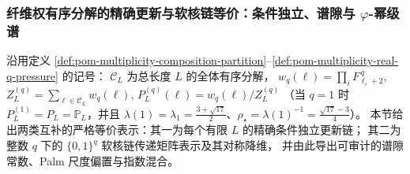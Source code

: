 %
%

\subsubsection{纤维权有序分解的精确更新与软核链等价：条件独立、谱隙与 \texorpdfstring{$\varphi$}{phi}-幂级谱}\label{subsec:pom-multiplicity-composition-exact-update-softcore}
沿用定义 \ref{def:pom-multiplicity-composition-partition}--\ref{def:pom-multiplicity-real-q-pressure} 的记号：
\(\mathcal{C}_L\) 为总长度 \(L\) 的全体有序分解，
\(
w_q(\boldsymbol{\ell})=\prod_i F_{\ell_i+2}^{\,q}
\),
\(
Z_L^{(q)}=\sum_{\boldsymbol{\ell}\in\mathcal{C}_L}w_q(\boldsymbol{\ell})
\),
\(
P_L^{(q)}(\boldsymbol{\ell})=w_q(\boldsymbol{\ell})/Z_L^{(q)}
\)
（当 \(q=1\) 时 \(P_L^{(1)}=P_L=\mathbb{P}_L\)，并且 \(\lambda(1)=\lambda_1=\frac{3+\sqrt{17}}{2}\)、\(\rho_\star=\lambda(1)^{-1}=\frac{\sqrt{17}-3}{4}\)）。
本节给出两类互补的严格等价表示：其一为每个有限 \(L\) 的精确条件独立更新链；
其二为整数 \(q\) 下的 \(\{0,1\}^q\) 软核链传递矩阵表示及其对称降维，
并由此导出可审计的谱隙常数、Palm 尺度偏置与指数混合。

